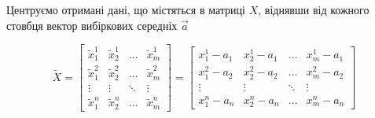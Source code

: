 Центруємо отримані дані, що містяться в матриці $X$, віднявши від кожного
стовбця вектор вибіркових середніх $\vec{a}$

\begin{equation*}
  \tilde{X}
  = \begin{bmatrix}
    \tilde{x}_1^1  & \tilde{x}_2^1  & \dots  & \tilde{x}_m^1  \\
    \tilde{x}_1^2  & \tilde{x}_2^2  & \dots  & \tilde{x}_m^2  \\
    \vdots & \vdots & \ddots & \vdots \\
    \tilde{x}_1^n  & \tilde{x}_2^n  & \dots  & \tilde{x}_m^n
  \end{bmatrix}
  = \begin{bmatrix}
    x_1^1 - a_1  & x_2^1 - a_1  & \dots  & x_m^1 - a_1 \\
    x_1^2 - a_2  & x_2^2 - a_2  & \dots  & x_m^2 - a_2 \\
    \vdots       & \vdots       & \ddots & \vdots      \\
    x_1^n - a_n  & x_2^n - a_n  & \dots  & x_m^n - a_n
  \end{bmatrix}
\end{equation*}

